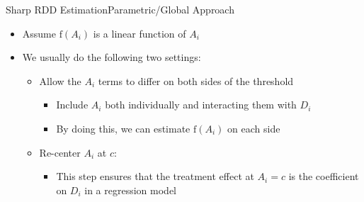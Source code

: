 \documentclass[dvipsnames,hyperref={pdfpagelabels=false}]{beamer}
\begin{document}
\begin{frame}{Sharp RDD Estimation}{Parametric/Global Approach}
	\begin{itemize}
		
		\item Assume $\mathrm{f}(A_i)$ is a linear function of $A_{i}$
		\vspace{0.2cm}
		\item We usually do the following two settings:
		\vspace{0.2cm}
			\begin{itemize}
		\item[1] Allow the $A_i$ terms to differ on both sides of the threshold 
				\vspace{0.2cm}
			\begin{itemize}
			\item Include $A_{i}$ both individually and interacting them with $D_i$
			\vspace{0.2cm}
			\item By doing this, we can estimate $\mathrm{f}(A_i)$ on each side
						\vspace{0.2cm}
		\end{itemize}
			\item[2] Re-center $A_{i}$ at $c$: 
		\vspace{0.2cm}
		\begin{itemize}
			\item This step ensures that the treatment effect at $A_i=c$ is the coefficient on $D_i$ in a regression model 
		\end{itemize}
		
			\end{itemize}
	
	
		
		
		
		
		
		
	\end{itemize}
\end{frame}
\end{document}
